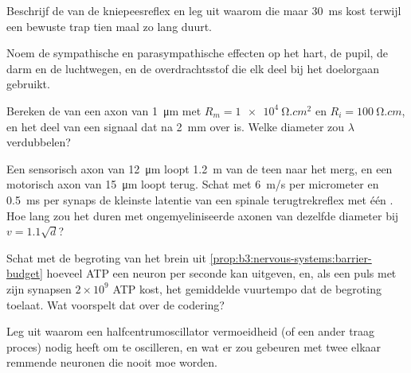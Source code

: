 \begin{exercise}[$\star$]\label{exo:b3:nervous-systems:3}
Beschrijf de  van de kniepeesreflex en leg uit waarom die
maar \qty{30}{ms} kost terwijl een bewuste trap tien maal zo lang duurt.
\end{exercise}

\begin{exercise}[$\star$]\label{exo:b3:nervous-systems:4}
Noem de sympathische en parasympathische effecten op het hart, de
pupil, de darm en de luchtwegen, en de overdrachtsstof die elk deel bij
het doelorgaan gebruikt.
\end{exercise}

\begin{exercise}[$\star\star$]\label{exo:b3:nervous-systems:5}
Bereken de  van een axon van \qty{1}{\micro m} met $R_{m}
= \qty{1e4}{\ohm.cm^2}$ en $R_{i} = \qty{100}{\ohm.cm}$, en het deel
van een signaal dat na \qty{2}{mm} over is. Welke diameter zou
$\lambda$ verdubbelen?
\end{exercise}

\begin{exercise}[$\star\star$]\label{exo:b3:nervous-systems:6}
Een sensorisch axon van \qty{12}{\micro m} loopt \qty{1.2}{m} van de
teen naar het merg, en een motorisch axon van \qty{15}{\micro m} loopt
terug. Schat met \qty{6}{m/s} per micrometer en \qty{0.5}{ms} per
synaps de kleinste latentie van een spinale terugtrekreflex met één
. Hoe lang zou het duren met ongemyeliniseerde axonen van
dezelfde diameter bij $v = 1.1\sqrt{d}$?
\end{exercise}

\begin{exercise}[$\star\star$]\label{exo:b3:nervous-systems:7}
Schat met de begroting van het brein uit
\cref{prop:b3:nervous-systems:barrier-budget} hoeveel ATP een neuron
per seconde kan uitgeven, en, als een puls met zijn synapsen
$2\times 10^{9}$ ATP kost, het gemiddelde vuurtempo dat de begroting
toelaat. Wat voorspelt dat over de codering?
\end{exercise}

\begin{exercise}[$\star\star$]\label{exo:b3:nervous-systems:8}
Leg uit waarom een halfcentrumoscillator vermoeidheid (of een ander
traag proces) nodig heeft om te oscilleren, en wat er zou gebeuren met
twee elkaar remmende neuronen die nooit moe worden.
\end{exercise}


